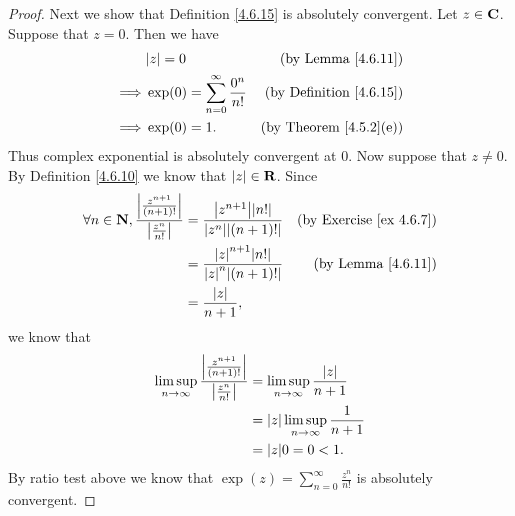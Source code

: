 \begin{proof}
    Next we show that Definition \ref{4.6.15} is absolutely convergent.
    Let \(z \in \mathbf{C}\).
    Suppose that \(z = 0\).
    Then we have
    \begin{align*}
                 & \abs{z} = 0                                  & \text{(by Lemma \ref{4.6.11})}      \\
        \implies & \exp(0) = \sum_{n = 0}^\infty \frac{0^n}{n!} & \text{(by Definition \ref{4.6.15})} \\
        \implies & \exp(0) = 1.                                 & \text{(by Theorem \ref{4.5.2}(e))}
    \end{align*}
    Thus complex exponential is absolutely convergent at \(0\).
    Now suppose that \(z \neq 0\).
    By Definition \ref{4.6.10} we know that \(\left\lvert z\right\rvert \in \mathbf{R}\).
    Since
    \begin{align*}
        \forall n \in \N, \frac{\abs{\frac{z^{n + 1}}{(n + 1)!}}}{\abs{\frac{z^n}{n!}}} & = \frac{\abs{z^{n + 1}} \abs{n!}}{\abs{z^n} \abs{(n + 1)!}} & \text{(by Exercise \ref{ex 4.6.7})} \\
                                                                                        & = \frac{\abs{z}^{n + 1} \abs{n!}}{\abs{z}^n \abs{(n + 1)!}} & \text{(by Lemma \ref{4.6.11})}      \\
                                                                                        & = \frac{\abs{z}}{n + 1},
    \end{align*}
    we know that
    \begin{align*}
        \limsup_{n \to \infty} \frac{\abs{\frac{z^{n + 1}}{(n + 1)!}}}{\abs{\frac{z^n}{n!}}} & = \limsup_{n \to \infty} \frac{\abs{z}}{n + 1}   \\
                                                                                             & = \abs{z} \limsup_{n \to \infty} \frac{1}{n + 1} \\
                                                                                             & = \abs{z} 0 = 0 < 1.
    \end{align*}
    By ratio test above we know that \(\exp(z) = \sum_{n = 0}^\infty \frac{z^n}{n!}\) is absolutely convergent.


\end{proof}
